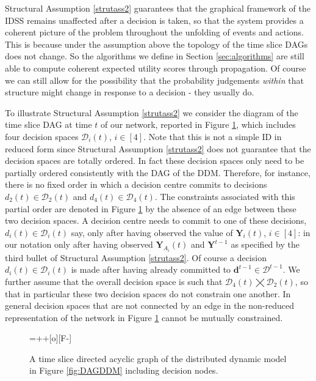 Structural Assumption \ref{strutass2} guarantees that the graphical framework of the IDSS remains unaffected after a decision is taken, so that the system  provides a coherent picture of the problem throughout the unfolding of events and actions. This is because under the assumption above  the topology of the time slice DAGs does not change. So the algorithms we define in Section \ref{sec:algorithms} are still able to compute coherent expected utility scores through propagation. Of course we can still allow for the possibility that the probability judgements \textit{within} that structure might change in response to a decision - they usually do.

\begin{example}
\label{ex:chapter4}
To illustrate Structural Assumption \ref{strutass2} we consider the diagram of the time slice DAG at time $t$ of our network, reported in Figure \ref{idstyle}, which includes four decision spaces $\mathcal{D}_i(t)$, $i\in[4]$. Note that this is not a simple ID in reduced form since Structural Assumption \ref{strutass2} does not guarantee that the decision spaces are totally ordered. In fact these decision spaces only need to be  partially ordered consistently with the DAG of the DDM. Therefore, for instance, there is no fixed order in which a decision centre commits to decisions $d_2(t)\in\mathcal{D}_2(t)$ and $d_4(t)\in\mathcal{D}_4(t)$. The constraints associated with this partial order are denoted in Figure \ref{idstyle} by the absence of an edge between these two decision spaces.   A decision centre needs to commit to one of these decisions, $d_i(t)\in\mathcal{D}_i(t)$ say, only after having observed the value of $\bm{Y}_i(t)$, $i\in[4]$: in our notation only after having observed $\bm{Y}_{A_i}(t)$ and $\bm{Y}^{t-1}$ as specified by the third bullet of Structural Assumption \ref{strutass2}. Of course a decision  $d_i(t)\in\mathcal{D}_i(t)$ is made after having already committed to $\bm{d}^{t-1}\in\bm{\mathcal{D}}^{t-1}$. We further assume that the overall decision space is such that $\mathcal{D}_4(t)\bigtimes\mathcal{D}_2(t)$, so that in particular these two decision spaces do not constrain one another. In general decision spaces that are not connected by an edge in the non-reduced representation of the network in Figure \ref{idstyle} cannot be mutually constrained.
\end{example}

\begin{figure}
\entrymodifiers={++[o][F-]}
\centerline{
}
\vspace{0.5cm}
\caption{A time slice directed acyclic graph of the distributed dynamic model in Figure \ref{fig:DAGDDM} including decision nodes. \label{idstyle}}
\end{figure}

